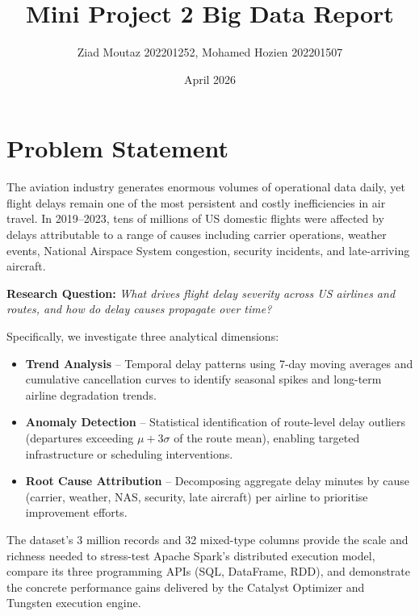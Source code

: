\documentclass{article}
\title{Mini Project 2 Big Data Report}
\author{Ziad Moutaz 202201252, Mohamed Hozien 202201507}
\date{April 2026}
\begin{document}
\maketitle

\section{Problem Statement}

The aviation industry generates enormous volumes of operational data daily, yet flight delays remain one of the most persistent and costly inefficiencies in air travel. In 2019--2023, tens of millions of US domestic flights were affected by delays attributable to a range of causes including carrier operations, weather events, National Airspace System congestion, security incidents, and late-arriving aircraft.

\textbf{Research Question:} \textit{What drives flight delay severity across US airlines and routes, and how do delay causes propagate over time?}

Specifically, we investigate three analytical dimensions:

\begin{itemize}
    \item \textbf{Trend Analysis} -- Temporal delay patterns using 7-day moving averages and cumulative cancellation curves to identify seasonal spikes and long-term airline degradation trends.
    \item \textbf{Anomaly Detection} -- Statistical identification of route-level delay outliers (departures exceeding $\mu + 3\sigma$ of the route mean), enabling targeted infrastructure or scheduling interventions.
    \item \textbf{Root Cause Attribution} -- Decomposing aggregate delay minutes by cause (carrier, weather, NAS, security, late aircraft) per airline to prioritise improvement efforts.
\end{itemize}

The dataset's 3 million records and 32 mixed-type columns provide the scale and richness needed to stress-test Apache Spark's distributed execution model, compare its three programming APIs (SQL, DataFrame, RDD), and demonstrate the concrete performance gains delivered by the Catalyst Optimizer and Tungsten execution engine.
\end{document}
